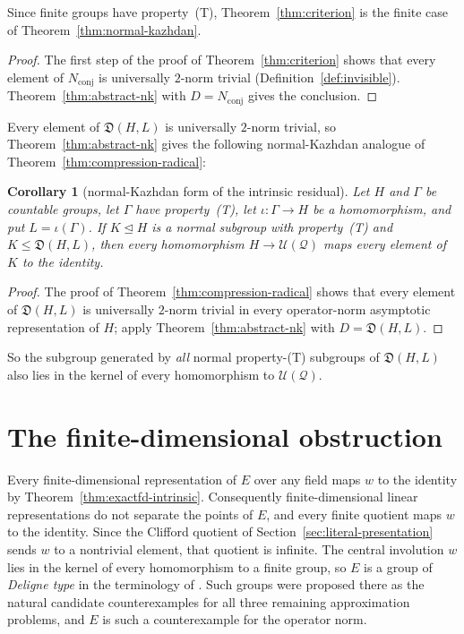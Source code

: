 \documentclass[11pt]{amsart}
\newcommand{\leanverified}[2]{\ignorespaces}
\newtheorem{corollary}[theorem]{Corollary}
\theoremstyle{definition}
\theoremstyle{remark}
\theoremstyle{plain}
\newcommand{\U}{\mathcal U}
\begin{document}
Since finite groups have property~\textup{(T)},
Theorem~\ref{thm:criterion} is the finite case of
Theorem~\ref{thm:normal-kazhdan}.

\begin{proof}
The first step of the proof of Theorem~\ref{thm:criterion} shows that
every element of $N_{\mathrm{conj}}$ is universally $2$-norm trivial
(Definition~\ref{def:invisible}).  Theorem~\ref{thm:abstract-nk} with
$D=N_{\mathrm{conj}}$ gives the conclusion.
\end{proof}

Every element of $\mathfrak D(H,L)$ is universally $2$-norm trivial, so
Theorem~\ref{thm:abstract-nk} gives the following normal-Kazhdan
analogue of Theorem~\ref{thm:compression-radical}:

\begin{corollary}[normal-Kazhdan form of the intrinsic residual]\label{cor:intrinsic-nk}
Let $H$ and $\Gamma$ be countable groups, let $\Gamma$ have
property~\textup{(T)}, let $\iota\colon\Gamma\to H$ be a homomorphism,
and put $L=\iota(\Gamma)$.  If $K\trianglelefteq H$ is a normal
subgroup with property~\textup{(T)} and $K\le\mathfrak D(H,L)$, then
every homomorphism $H\to\U(\mathcal Q)$ maps every
element of $K$ to the identity.
\leanverified{Sofic/NormalKazhdanAnyUniverse}{GroupApproximation.ManuscriptExactWrappers.manuscriptIntrinsicNormalKazhdanRadical_anyUniverse}
\end{corollary}

\begin{proof}
The proof of Theorem~\ref{thm:compression-radical} shows that every
element of $\mathfrak D(H,L)$ is universally $2$-norm trivial in every
operator-norm asymptotic representation of $H$; apply
Theorem~\ref{thm:abstract-nk} with $D=\mathfrak D(H,L)$.
\end{proof}

So the subgroup generated by \emph{all} normal property-\textup{(T)}
subgroups of $\mathfrak D(H,L)$ also lies in the kernel of
every homomorphism to $\U(\mathcal Q)$.
\leanverified{Sofic/NormalKazhdanAnyUniverse}{GroupApproximation.ManuscriptExactWrappers.manuscriptIntrinsicNormalKazhdanPart_anyUniverse}

\section{The finite-dimensional obstruction}\label{sec:findim}

Every finite-dimensional representation of $E$ over any field maps
$w$ to the identity by Theorem~\ref{thm:exactfd-intrinsic}.
Consequently finite-dimensional linear representations do not separate
the points of $E$, and every finite quotient maps $w$ to the
identity.  Since the
Clifford quotient of Section~\ref{sec:literal-presentation} sends $w$ to a
nontrivial element, that quotient is infinite.  The central involution
$w$ lies in the kernel of every homomorphism to a finite group, so $E$
is a group of \emph{Deligne type} in the terminology of
\cite[Definition~1.2]{BDL}.  Such groups were proposed there as the
natural candidate counterexamples for all three remaining approximation
problems, and $E$ is such a counterexample for the operator norm.
\end{document}
